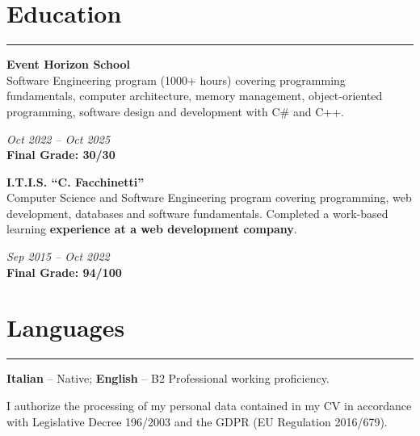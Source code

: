\documentclass[8.5pt]{article}
\newcommand{\sectionline}{
    \vspace{0pt}
    \hrule
    \vspace{2pt}
}
\newcommand{\cvsection}[1]{
    \section*{#1}
    \sectionline
}
\newcommand{\eduentry}[4]{
    \noindent
    \begin{minipage}[t]{0.72\textwidth}
    \vspace{0pt}
    \textbf{#1}\\[-1pt]
    #2
    \end{minipage}\hfill
    \begin{minipage}[t]{0.25\textwidth}
    \vspace{0pt}
    \raggedleft
    \textit{#3}\\
    \textbf{Final Grade: #4}
    \end{minipage}\par
}
\begin{document}

    \cvsection{Education}

    \eduentry
    {Event Horizon School}
    {Software Engineering program (1000+ hours) covering programming fundamentals, computer architecture, memory management, object-oriented programming, software design and development with C\# and C++.}
    {Oct 2022 -- Oct 2025}
    {30/30}

    \vspace{2pt}

    \eduentry
    {I.T.I.S. ``C. Facchinetti''}
    {Computer Science and Software Engineering program covering programming, web development, databases and software fundamentals. Completed a work-based learning \textbf{experience at a web development company}.}
    {Sep 2015 -- Oct 2022}
    {94/100}

    \vspace{2pt}

    \cvsection{Languages}
    \textbf{Italian} – Native; \textbf{English} – B2 Professional working proficiency.

    \centerline{
        \scriptsize
        I authorize the processing of my personal data contained in my CV in accordance with Legislative Decree 196/2003 and the GDPR (EU Regulation 2016/679).
    }
\end{document}
